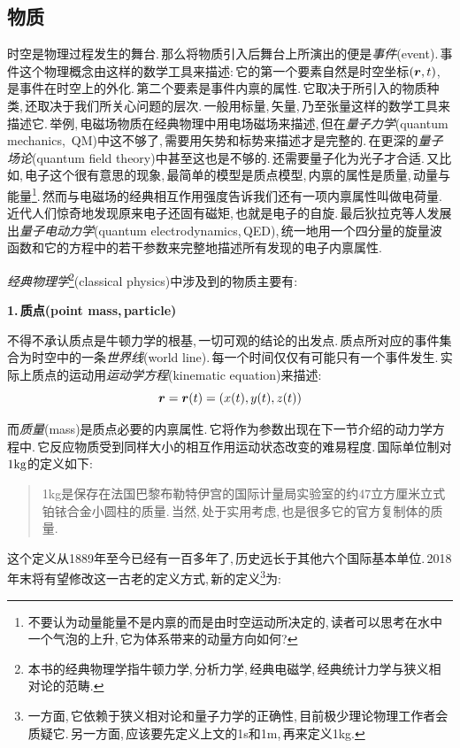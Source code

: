 \subsection{物质}

时空是物理过程发生的舞台.\,那么将物质引入后舞台上所演出的便是\emph{事件}(event).\,事件这个物理概念由这样的数学工具来描述:\,它的第一个要素自然是时空坐标$(\boldsymbol{r},t)$,\,是事件在时空上的外化.\,第二个要素是事件内禀的属性.\,它取决于所引入的物质种类,\,还取决于我们所关心问题的层次.\,一般用标量,\,矢量,\,乃至张量这样的数学工具来描述它.\,举例,\,电磁场物质在经典物理中用电场磁场来描述,\,但在\emph{量子力学}(quantum mechanics,\, QM)中这不够了,\,需要用矢势和标势来描述才是完整的.\,在更深的\emph{量子场论}(quantum field theory)中甚至这也是不够的.\,还需要量子化为光子才合适.\,又比如,\,电子这个很有意思的现象,\,最简单的模型是质点模型,\,内禀的属性是质量,\,动量与能量\footnote{不要认为动量能量不是内禀的而是由时空运动所决定的,\,读者可以思考在水中一个气泡的上升,\,它为体系带来的动量方向如何?}.\,然而与电磁场的经典相互作用强度告诉我们还有一项内禀属性叫做电荷量.\,近代人们惊奇地发现原来电子还固有磁矩,\,也就是电子的自旋.\,最后狄拉克等人发展出\emph{量子电动力学}(quantum electrodynamics,\,QED),\,统一地用一个四分量的旋量波函数和它的方程中的若干参数来完整地描述所有发现的电子内禀属性.

\vspace{0.5cm}
\emph{经典物理学}\footnote{本书的经典物理学指牛顿力学,\,分析力学,\,经典电磁学,\,经典统计力学与狭义相对论的范畴.}(classical physics)中涉及到的物质主要有:

\vspace{0.2cm}
{\bf 1.\,质点(point mass,\,particle)}

不得不承认质点是牛顿力学的根基,\,一切可观的结论的出发点.\,质点所对应的事件集合为时空中的一条\emph{世界线}(world line).\,每一个时间仅仅有可能只有一个事件发生.\,实际上质点的运动用\emph{运动学方程}(kinematic equation)来描述:
\[\boldsymbol{r}=\boldsymbol{r}(t)=\left(x(t),y(t),z(t)\right)\]

而\emph{质量}(mass)是质点必要的内禀属性.\,它将作为参数出现在下一节介绍的动力学方程中.\,它反应物质受到同样大小的相互作用运动状态改变的难易程度.\,国际单位制对$1\rm kg$的定义如下:

\begin{verse}
1kg是保存在法国巴黎布勒特伊宫的国际计量局实验室的约47立方厘米立式铂铱合金小圆柱的质量.\,当然,\,处于实用考虑,\,也是很多它的官方复制体的质量.
\end{verse}

这个定义从1889年至今已经有一百多年了,\,历史远长于其他六个国际基本单位.\,2018年末将有望修改这一古老的定义方式,\,新的定义\footnote{一方面,\,它依赖于狭义相对论和量子力学的正确性,\,目前极少理论物理工作者会质疑它.\,另一方面,\,应该要先定义上文的1s和1m,\,再来定义1kg.}为:

